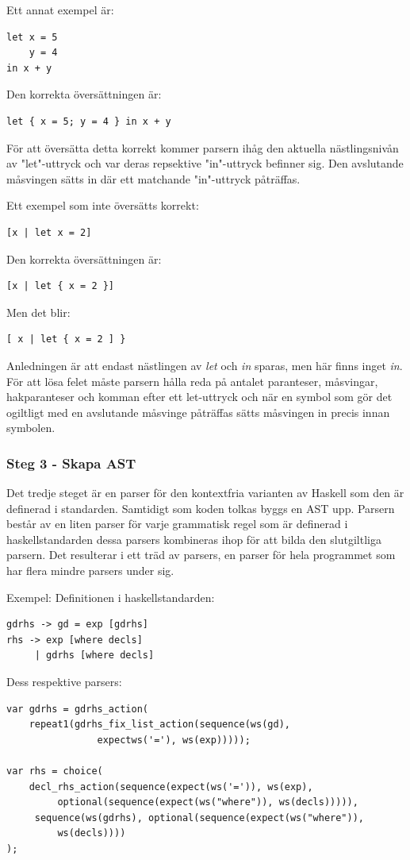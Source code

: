 Ett annat exempel är:
\begin{lstlisting}
let x = 5
    y = 4
in x + y
\end{lstlisting}
Den korrekta översättningen är:
\begin{lstlisting}
let { x = 5; y = 4 } in x + y
\end{lstlisting}
För att översätta detta korrekt kommer parsern ihåg den aktuella nästlingsnivån av "let"-uttryck och var deras repsektive "in"-uttryck befinner sig. 
Den avslutande måsvingen sätts in där ett matchande "in"-uttryck påträffas.

Ett exempel som inte översätts korrekt:
\begin{lstlisting}
[x | let x = 2]
\end{lstlisting}
Den korrekta översättningen är:
\begin{lstlisting}
[x | let { x = 2 }]
\end{lstlisting}
Men det blir:
\begin{lstlisting}
[ x | let { x = 2 ] }
\end{lstlisting}
Anledningen är att endast nästlingen av \emph{let} och \emph{in} sparas, men här finns inget \emph{in}.
För att lösa felet måste parsern hålla reda på antalet paranteser, måsvingar, hakparanteser och komman efter ett let-uttryck och när en symbol som gör det ogiltligt 
med en avslutande måsvinge påträffas sätts måsvingen in precis innan symbolen.

\subsubsection{Steg 3 - Skapa AST}
Det tredje steget är en parser för den kontextfria varianten av Haskell som den är definerad i standarden. 
Samtidigt som koden tolkas byggs en AST upp. Parsern består av en liten parser för varje grammatisk regel som är definerad i haskellstandarden 
dessa parsers kombineras ihop för att bilda den slutgiltliga parsern. Det resulterar i ett träd av parsers, en parser för hela programmet som har flera mindre parsers under sig.

Exempel:
Definitionen i haskellstandarden:
\begin{lstlisting}
gdrhs -> gd = exp [gdrhs]
rhs -> exp [where decls]
     | gdrhs [where decls]
\end{lstlisting}
Dess respektive parsers:
\begin{lstlisting}
var gdrhs = gdrhs_action(
    repeat1(gdrhs_fix_list_action(sequence(ws(gd), 
                expectws('='), ws(exp)))));

var rhs = choice(
    decl_rhs_action(sequence(expect(ws('=')), ws(exp), 
         optional(sequence(expect(ws("where")), ws(decls))))),
     sequence(ws(gdrhs), optional(sequence(expect(ws("where")), 
         ws(decls))))
);
\end{lstlisting}

